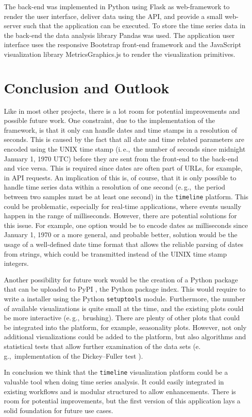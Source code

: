 \documentclass[runningheads,a4paper,11pt]{llncs}
\newcommand{\eg}{e.\,g.,\ }
\newcommand{\ie}{i.\,e.,\ }
\begin{document}
The back-end was implemented in Python using Flask \cite{Flask} as web-framework to render the user interface, deliver data using the API, and provide a small web-server such that the application can be executed.
To store the time series data in the back-end the data analysis library Pandas \cite{McKinney2010} was used. 
The application user interface uses the responsive Bootstrap \cite{Bootstrap} front-end framework and the JavaScript visualization library MetricsGraphics.js \cite{MetricsGraphics} to render the visualization primitives. 


\section{Conclusion and Outlook}\label{sec:conclusion}

Like in most other projects, there is a lot room for potential improvements and possible future work.
One constraint, due to the implementation of the framework, is that it only can handle dates and time stamps in a resolution of seconds.
This is caused by the fact that all date and time related parameters are encoded using the UNIX time stamp (\ie the number of seconds since midnight January 1, 1970 UTC) before they are sent from the front-end to the back-end and vice versa.
This is required since dates are often part of URLs, for example, in API requests.
An implication of this is, of course, that it is only possible to handle time series data within a resolution of one second (\eg the period between two samples must be at least one second) in the \texttt{timeline} platform.
This could be problematic, especially for real-time applications, where events usually happen in the range of milliseconds.
However, there are potential solutions for this issue.
For example, one option would be to encode dates as milliseconds since January 1, 1970 or a more general, and probable better, solution would be the usage of a well-defined date time format that allows the reliable parsing of dates from strings, which could be transmitted instead of the UINIX time stamp integers.

Another possibility for future work would be the creation of a Python package that can be uploaded to PyPI \cite{PyPI}, the Python package index.
This would require to write a installer using the Python \texttt{setuptools} module. 
Furthermore, the number of available visualizations is quite small at the time, and the existing plots could be more interactive (\eg brushing).
There are plenty of other plots that could be integrated into the platform, for example, seasonality plots.
However, not only additional visualizations could be added to the platform, but also algorithms and statistical tests that allow further examination of the data sets (\eg implementation of the Dickey--Fuller test \cite{Dickey1979}).

In conclusion we think that the \texttt{timeline} visualization platform could be a valuable tool when doing time series analysis.
It could easily integrated in existing workflows and is modular structured to allow enhancements. 
There is room for potential improvements, but the first version of this application lays a solid foundation for future use cases. 



\end{document}
